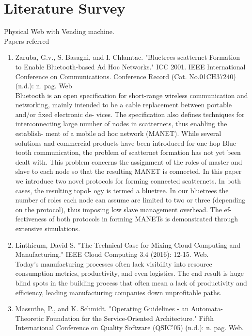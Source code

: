 \documentclass[oneside,a4paper,12pt]{report}
\begin{document}
\section{Literature Survey}
 Physical Web with Vending machine.\\
Papers referred\\
\begin{enumerate}
\item Zaruba, G.v., S. Basagni, and I. Chlamtac. "Bluetrees-scatternet Formation to Enable Bluetooth-based Ad Hoc Networks." ICC 2001. IEEE International Conference on Communications. Conference Record (Cat. No.01CH37240) (n.d.): n. pag. Web\\
Bluetooth is an open specification for short-range
wireless communication and networking, mainly intended to be
a cable replacement between portable and/or fixed electronic de-
vices. The specification also defines techniques for interconnecting
large number of nodes in scatternets, thus enabling the establish-
ment of a mobile ad hoc network (MANET). While several solutions
and commercial products have been introduced for one-hop Blue-
tooth communication, the problem of scatternet formation has not
yet been dealt with. This problem concerns the assignment of the
roles of master and slave to each node so that the resulting MANET
is connected. In this paper we introduce two novel protocols for
forming connected scatternets. In both cases, the resulting topol-
ogy is termed a bluetree. In our bluetrees the number of roles each
node can assume are limited to two or three (depending on the
protocol), thus imposing low slave management overhead. The ef-
fectiveness of both protocols in forming MANETs is demonstrated
through extensive simulations.\\
\item Linthicum, David S. "The Technical Case for Mixing Cloud Computing and Manufacturing." IEEE Cloud Computing 3.4 (2016): 12-15. Web.\\
Today’s manufacturing processes often lack visibility into resource consumption metrics, productivity, and even logistics. The end result is huge blind spots in the building process that often mean a lack of productivity and efficiency, leading manufacturing companies down unprofitable paths.\\
\item Massuthe, P., and K. Schmidt. "Operating Guidelines - an Automata-Theoretic Foundation for the Service-Oriented Architecture." Fifth International Conference on Quality Software (QSIC'05) (n.d.): n. pag. Web.\\

\end{enumerate}
\end{document}
